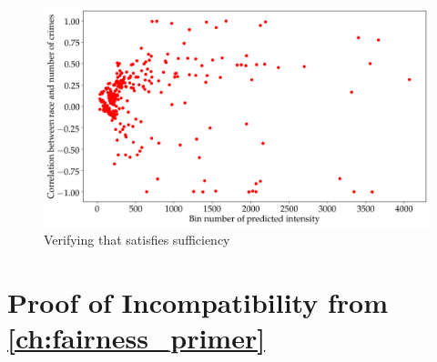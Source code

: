 \begin{figure}[bth]
    \myfloatalign
    \includegraphics[width=.9\linewidth]{gfx/CalibrationScatter.png}
    \caption{Verifying that \pp satisfies sufficiency}
    \label{fig:sufficiency}
\end{figure}

\pagebreak
\section{Proof of Incompatibility from \autoref{ch:fairness_primer}} \label{proof:ch_3}

